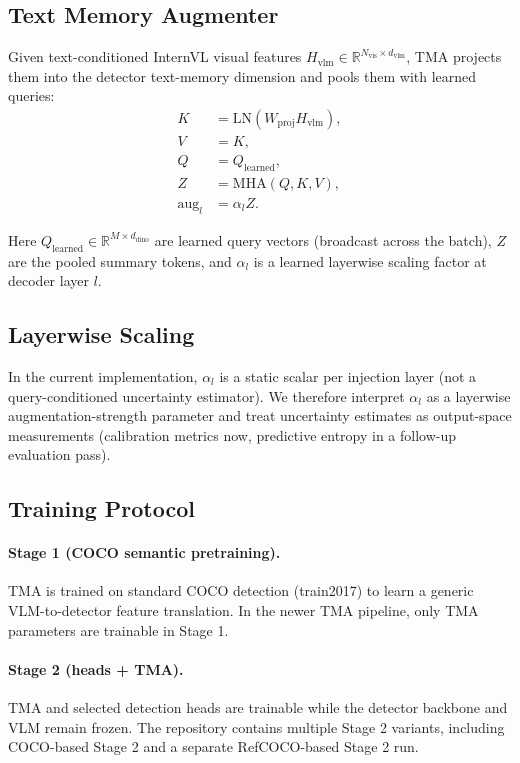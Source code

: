 \documentclass{uai2026} %
\begin{document}
\subsection{Text Memory Augmenter}
Given text-conditioned InternVL visual features \(H_{\text{vlm}} \in \mathbb{R}^{N_{\text{vis}} \times d_{\text{vlm}}}\), TMA projects them into the detector text-memory dimension and pools them with learned queries:
\begin{align}
K &= \mathrm{LN}(W_{\text{proj}} H_{\text{vlm}}), \\
V &= K, \\
Q &= Q_{\text{learned}}, \\
Z &= \mathrm{MHA}(Q, K, V), \\
\text{aug}_l &= \alpha_l Z.
\end{align}

Here \(Q_{\text{learned}} \in \mathbb{R}^{M \times d_{\text{dino}}}\) are learned query vectors (broadcast across the batch), \(Z\) are the pooled summary tokens, and \(\alpha_l\) is a learned layerwise scaling factor at decoder layer \(l\).

\subsection{Layerwise Scaling}
In the current implementation, \(\alpha_l\) is a static scalar per injection layer (not a query-conditioned uncertainty estimator). We therefore interpret \(\alpha_l\) as a layerwise augmentation-strength parameter and treat uncertainty estimates as output-space measurements (calibration metrics now, predictive entropy in a follow-up evaluation pass).

\subsection{Training Protocol}
\paragraph{Stage 1 (COCO semantic pretraining).}
TMA is trained on standard COCO detection (train2017) to learn a generic VLM-to-detector feature translation. In the newer TMA pipeline, only TMA parameters are trainable in Stage 1.

\paragraph{Stage 2 (heads + TMA).}
TMA and selected detection heads are trainable while the detector backbone and VLM remain frozen. The repository contains multiple Stage 2 variants, including COCO-based Stage 2 and a separate RefCOCO-based Stage 2 run.
\end{document}
